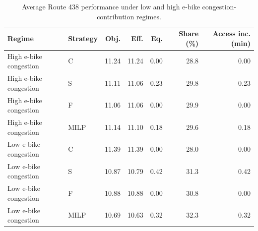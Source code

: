 \begin{table}[htbp]
\centering
\small
\caption{Average Route 438 performance under low and high e-bike congestion-contribution regimes.}
\label{tab:route438_mu_sensitivity_summary}
\begin{tabular}{llrrrrr}
\toprule
Regime & Strategy & Obj. & Eff. & Eq. & Share (\%) & Access inc. (min) \\
\midrule
High e-bike congestion & C & 11.24 & 11.24 & 0.00 & 28.8 & 0.00 \\
High e-bike congestion & S & 11.11 & 11.06 & 0.23 & 29.8 & 0.23 \\
High e-bike congestion & F & 11.06 & 11.06 & 0.00 & 29.9 & 0.00 \\
High e-bike congestion & MILP & 11.14 & 11.10 & 0.18 & 29.6 & 0.18 \\
Low e-bike congestion & C & 11.39 & 11.39 & 0.00 & 28.0 & 0.00 \\
Low e-bike congestion & S & 10.87 & 10.79 & 0.42 & 31.3 & 0.42 \\
Low e-bike congestion & F & 10.88 & 10.88 & 0.00 & 30.8 & 0.00 \\
Low e-bike congestion & MILP & 10.69 & 10.63 & 0.32 & 32.3 & 0.32 \\
\bottomrule
\end{tabular}
\end{table}
